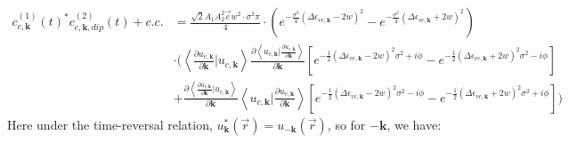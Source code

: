 \begin{equation}
\begin{aligned}
    c^{(1)}_{c,\mathbf k}(t)^* c^{(2)}_{c,\mathbf k,dip}(t) +c.c.&=\frac{\sqrt{2}A_1A_2^2 \vec e w^2 \cdot \sigma^2 \pi}{4}\cdot(e^{-\frac{\sigma^2}{4} (\Delta \epsilon_{vc,\mathbf k}-2w)^2}-e^{-\frac{\sigma^2}{4} (\Delta \epsilon_{vc,\mathbf k}+2w)^2})\\
    &\cdot (\left \langle \frac{\partial u_{v,\mathbf k}}{\partial \mathbf k} |  u_{c,\mathbf k} \right \rangle \frac{\partial{\left \langle u_{c,\mathbf k}\Big |\frac{\partial u_{v,\mathbf k}}{\partial \mathbf k} \right \rangle}}{\partial {\mathbf k}} 
    [e^{-\frac{1}{2}(\Delta \epsilon_{vc,\mathbf k} - 2w)^2 \sigma^2+i\phi}
    -e^{-\frac{1}{2}(\Delta \epsilon_{vc,\mathbf k} + 2w)^2 \sigma^2-i\phi}]\\
    &+ \frac{\partial{\left \langle \frac{\partial u_{v,\mathbf k}}{\partial \mathbf k} \Big |u_{c,\mathbf k} \right \rangle}}{\partial {\mathbf k}} 
    \left \langle  u_{c,\mathbf k}| \frac{\partial u_{v,\mathbf k}}{\partial \mathbf k} \right \rangle 
    [e^{-\frac{1}{2}(\Delta \epsilon_{vc,\mathbf k} - 2w)^2 \sigma^2-i\phi}
    -e^{-\frac{1}{2}(\Delta \epsilon_{vc,\mathbf k} + 2w)^2 \sigma^2+i\phi}])
\end{aligned}
\end{equation}
 Here under the time-reversal relation, $u^*_{\mathbf k}(\vec r)= u_{-\mathbf k}(\vec r)$, so for $-\mathbf k$, we have:
 
